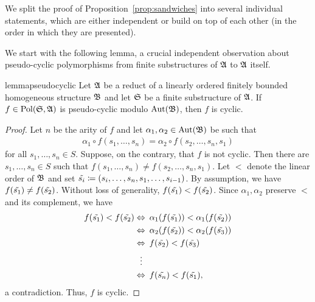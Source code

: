 We split the proof of Proposition~\ref{prop:sandwiches} into several individual statements, which are either independent or build on top of each other (in the order in which they are presented).

We start with the following lemma, a crucial independent observation about pseudo-cyclic polymorphisms from finite substructures of $\struct{A}$ to $\struct{A}$ itself.

\begin{restatable}{lemma}{pseudocyclic} \label{lemma:pseudocyclic}  
 Let $\struct{A}$ be a reduct of a linearly ordered finitely bounded homogeneous structure $\struct{B}$ and let $\struct{S}$ be a finite substructure of $\struct{A}$. If $f\in \Pol(\struct{S},\struct{A})$ is pseudo-cyclic modulo $\Aut(\struct{B})$, then $f$ is cyclic.
 \end{restatable}   
 
    \begin{proof}
        Let $n$ be the arity of $f$ and let $\alpha_1,\alpha_2\in \Aut(\struct{B})$ be such that 
        \begin{align*}
            \alpha_1\circ f(s_1,\dots,s_n)=\alpha_2\circ f(s_2,\dots,s_n,s_1) 
        \end{align*}
        for all $s_1,\dots, s_n\in S$.
        Suppose, on the contrary, that $f$ is not cyclic. 
        Then there are $s_1,\dots,s_n\in S$ such that $f(s_1,\dots,s_n)\neq f(s_2,\dots,s_n,s_1)$. 
        Let $<$ denote the linear order of $\struct{B}$ and set $\Tilde{s_i} \coloneqq (s_i,\dots,s_n,s_1,\dots,s_{i-1})$.
        By assumption, we have $f(\Tilde{s_1})\neq f(\Tilde{s_2})$.
        Without loss of generality, $f(\Tilde{s_1})<f(\Tilde{s_2})$. 
        Since $\alpha_1,\alpha_2$ preserve $<$ and its complement, we have 
        \begin{align*}
            f(\Tilde{s_1})<f(\Tilde{s_2})\Leftrightarrow&\enspace\alpha_1(f(\Tilde{s_1}))<\alpha_1(f(\Tilde{s_2}))\\
            \Leftrightarrow&\enspace\alpha_2(f(\Tilde{s_2}))<\alpha_2(f(\Tilde{s_3}))\\
            \Leftrightarrow&\enspace f(\Tilde{s_2})<f(\Tilde{s_3})\\
           \vdots \  &  \\
            \Leftrightarrow&\enspace f(\Tilde{s_n})<f(\Tilde{s_1}),
        \end{align*}
        a contradiction. Thus, $f$ is cyclic.
    \end{proof} 


